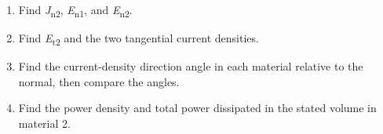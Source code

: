 \documentclass[11pt]{article}
\begin{document}
\begin{keepsection}
\begin{keepsection}
\begin{enumerate}
\item Find \textit{J}\textsubscript{n2}, \textit{E}\textsubscript{n1}, and \textit{E}\textsubscript{n2}.
\item Find \textit{E}\textsubscript{t2} and the two tangential current densities.
\item Find the current-density direction angle in each material relative to the normal, then compare the angles.
\item Find the power density and total power dissipated in the stated volume in material 2.
\end{enumerate}

\end{keepsection}
\end{keepsection}
\end{document}
